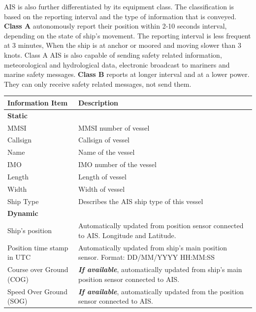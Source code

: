 AIS is also further differentiated by its equipment class. The classification is based on the reporting interval and the type of information that is conveyed. \textbf{Class A} autonomously report their position within 2-10 seconds interval, depending on the state of ship's movement. The reporting interval is less frequent at 3 minutes, When the ship is at anchor or moored and moving slower than 3 knots. Class A AIS is also capable of sending safety related information, meteorological and hydrological data, electronic broadcast to mariners and marine safety messages. \textbf{Class B} reports at longer interval and at a lower power. They can only receive safety related messages, not send them. \citep{Rakke2016,webimo.2014}\\
\begin{table}
    {\begin{tabular}{ |p{6cm}|p{9cm}|  }
    \hline
    \textbf{Information Item} & \textbf{Description} \\
    \hline
    \multicolumn{2}{|l|}{\textbf{Static}}\\
    \hline
    MMSI & MMSI number of vessel\\
    \hline
    Callsign & Callsign of vessel \\
    \hline
    Name & Name of the vessel \\
    \hline
    IMO & IMO number of the vessel \\
    \hline
    Length & Length of vessel \\
    \hline
    Width & Width of vessel \\
    \hline
    Ship Type & Describes the AIS ship type of this vessel \\
    \hline
    \multicolumn{2}{|l|}{\textbf{Dynamic}}\\
    \hline
    Ship's position & Automatically updated from position sensor connected to AIS. Longitude and Latitude.\\
    \hline
    Position time stamp in UTC & Automatically updated from ship's main position sensor. Format: DD\slash MM\slash YYYY HH:MM:SS\\
    \hline
    Course over Ground (COG) & \emph{\textbf{If available}}, automatically updated from ship's main position sensor connected to AIS.\\  
    \hline
    Speed Over Ground (SOG) & \emph{\textbf{If available}}, automatically updated from the position sensor connected to AIS.\\

\end{tabular}}
\end{table}
